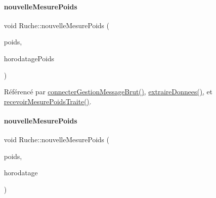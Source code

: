 \mbox{\label{class_ruche_abe5e5d4f4070766d5295d4dc6e0ce03c}} 
\paragraph{\texorpdfstring{nouvelle\+Mesure\+Poids}{nouvelleMesurePoids}\hspace{0.1cm}{\footnotesize\ttfamily [1/2]}}
{\footnotesize\ttfamily void Ruche\+::nouvelle\+Mesure\+Poids (\begin{DoxyParamCaption}\item[{Q\+String}]{poids,  }\item[{Q\+String}]{horodatage\+Poids }\end{DoxyParamCaption})\hspace{0.3cm}{\ttfamily [signal]}}



Référencé par \hyperlink{class_ruche_a9c8e7e3b529676c6dda3d936370af00f}{connecter\+Gestion\+Message\+Brut()}, \hyperlink{class_ruche_a21c0dafeaec03d451590037343e6a3ca}{extraire\+Donnees()}, et \hyperlink{class_ruche_afd8b0d7512f325327704cd3e37091dc2}{recevoir\+Mesure\+Poids\+Traite()}.

\mbox{\label{class_ruche_a094d288ac798e0011e29242db0c7a34e}} 
\paragraph{\texorpdfstring{nouvelle\+Mesure\+Poids}{nouvelleMesurePoids}\hspace{0.1cm}{\footnotesize\ttfamily [2/2]}}
{\footnotesize\ttfamily void Ruche\+::nouvelle\+Mesure\+Poids (\begin{DoxyParamCaption}\item[{double}]{poids,  }\item[{Q\+String}]{horodatage }\end{DoxyParamCaption})\hspace{0.3cm}{\ttfamily [signal]}}

\mbox{\label{class_ruche_a7948d81996c196eeb0f20dc203a52e75}} 
